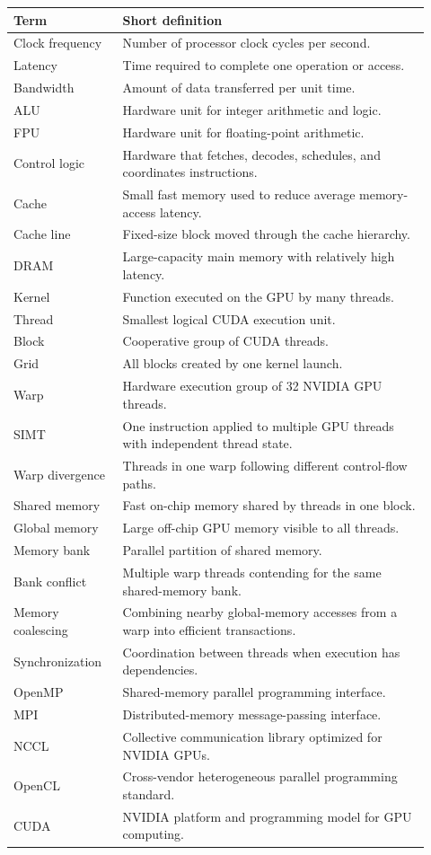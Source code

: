 \documentclass[11pt,a4paper]{article}
\begin{document}
\begin{center}
\renewcommand{\arraystretch}{1.25}
\begin{tabular}{p{0.24\linewidth}p{0.68\linewidth}}
\toprule
Term & Short definition \\
\midrule
Clock frequency & Number of processor clock cycles per second. \\
Latency & Time required to complete one operation or access. \\
Bandwidth & Amount of data transferred per unit time. \\
ALU & Hardware unit for integer arithmetic and logic. \\
FPU & Hardware unit for floating-point arithmetic. \\
Control logic & Hardware that fetches, decodes, schedules, and coordinates instructions. \\
Cache & Small fast memory used to reduce average memory-access latency. \\
Cache line & Fixed-size block moved through the cache hierarchy. \\
DRAM & Large-capacity main memory with relatively high latency. \\
Kernel & Function executed on the GPU by many threads. \\
Thread & Smallest logical CUDA execution unit. \\
Block & Cooperative group of CUDA threads. \\
Grid & All blocks created by one kernel launch. \\
Warp & Hardware execution group of 32 NVIDIA GPU threads. \\
SIMT & One instruction applied to multiple GPU threads with independent thread state. \\
Warp divergence & Threads in one warp following different control-flow paths. \\
Shared memory & Fast on-chip memory shared by threads in one block. \\
Global memory & Large off-chip GPU memory visible to all threads. \\
Memory bank & Parallel partition of shared memory. \\
Bank conflict & Multiple warp threads contending for the same shared-memory bank. \\
Memory coalescing & Combining nearby global-memory accesses from a warp into efficient transactions. \\
Synchronization & Coordination between threads when execution has dependencies. \\
OpenMP & Shared-memory parallel programming interface. \\
MPI & Distributed-memory message-passing interface. \\
NCCL & Collective communication library optimized for NVIDIA GPUs. \\
OpenCL & Cross-vendor heterogeneous parallel programming standard. \\
CUDA & NVIDIA platform and programming model for GPU computing. \\
\bottomrule
\end{tabular}
\end{center}
\end{document}
